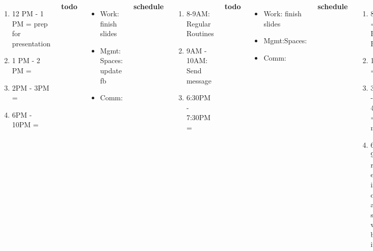 \begin{frame}
{\begin{columns}
\begin{enumerate}
          \item \tiny 12 PM - 1 PM = prep for presentation 
          \item \tiny 1 PM - 2 PM = 
            \tiny \item \tiny 2PM - 3PM = 
          \item \tiny 6PM - 10PM = 
          \end{enumerate}  
          
          \textbf{\small todo} \\
          \begin{itemize}
            \tiny \item \tiny Work: finish slides   
          \item \tiny Mgmt: Spaces: update fb 
          \item \tiny Comm: 
          \end{itemize}
          \textbf{\small schedule} \\
          \begin{enumerate}
            \tiny \item \tiny 8-9AM: Regular Routines 
          \item \tiny 9AM - 10AM: Send message 
            \item \tiny 6:30PM - 7:30PM = 
          \end{enumerate} 
          \textbf{\small todo}\\
          \begin{itemize}  
            \tiny \item \tiny Work: finish slides 
            \item \tiny Mgmt:Spaces: 
            \item \tiny Comm: 

          \end{itemize} 

          \textbf{\small schedule}\\
          \begin{enumerate} 
            \tiny \item \tiny 8-9AM = Regular Routines 
            \item \tiny 12-1PM = 
            \item \tiny 3:30PM - 4:30PM = group meeting 
            \item \tiny 6PM - 9PM = revise emot. int. chapter and
              structure wl-cheat based on it 
          \end{enumerate} 
          

\end{columns}}
\end{frame}
